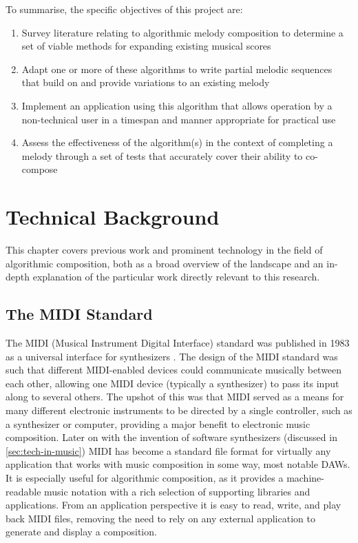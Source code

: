 \documentclass[ author={Stephen Livermore-Tozer},
				supervisor={Dr. Peter Flach},
				degree={MEng},
				title={Algorithmic Co-composition Using Machine Learning},
				subtitle={},
				type={research},
				year={2016} ]{dissertation}
\begin{document}
	To summarise, the specific objectives of this project are:
	\begin{enumerate}
		\item Survey literature relating to algorithmic melody composition to determine a set of viable methods for expanding existing musical scores
		\item Adapt one or more of these algorithms to write partial melodic sequences that build on and provide variations to an existing melody
		\item Implement an application using this algorithm that allows operation by a non-technical user in a timespan and manner appropriate for practical use
		\item Assess the effectiveness of the algorithm(s) in the context of completing a melody through a set of tests that accurately cover their ability to co-compose
	\end{enumerate}
	
	
	\chapter{Technical Background}
	\label{chap:technical}
	
	This chapter covers previous work and prominent technology in the field of algorithmic composition, both as a broad overview of the landscape and an in-depth explanation of the particular work directly relevant to this research.
	
	\section{The MIDI Standard}
	\label{sec:midi}
	
	The MIDI (Musical Instrument Digital Interface) standard was published in 1983 as a universal interface for synthesizers  \cite{swift1997brief}. The design of the MIDI standard was such that different MIDI-enabled devices could communicate musically between each other, allowing one MIDI device (typically a synthesizer) to pass its input along to several others. The upshot of this was that MIDI served as a means for many different electronic instruments to be directed by a single controller, such as a synthesizer or computer, providing a major benefit to electronic music composition. Later on with the invention of software synthesizers (discussed in \ref{sec:tech-in-music}) MIDI has become a standard file format for virtually any application that works with music composition in some way, most notable DAWs. It is especially useful for algorithmic composition, as it provides a machine-readable music notation with a rich selection of supporting libraries and applications. From an application perspective it is easy to read, write, and play back MIDI files, removing the need to rely on any external application to generate and display a composition. 
	
\end{document}
